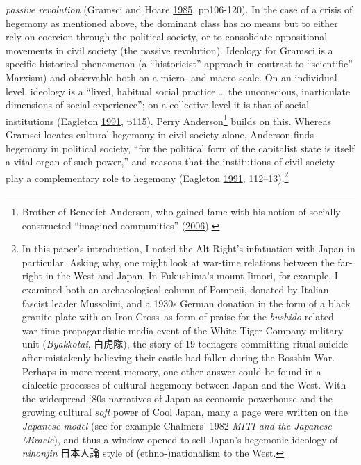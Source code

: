 \documentclass[10pt,british,A4paper,,openany]{memoir}
\begin{document}
\emph{passive revolution} (Gramsci and Hoare
\protect\hyperlink{ref-gramsci_selections_1985}{1985}, pp106-120). In
the case of a crisis of hegemony as mentioned above, the dominant class
has no means but to either rely on coercion through the political
society, or to consolidate oppositional movements in civil society (the
passive revolution). Ideology for Gramsci is a specific historical
phenomenon (a ``historicist'' approach in contrast to ``scientific''
Marxism) and observable both on a micro- and macro-scale. On an
individual level, ideology is a ``lived, habitual social practice
\ldots{} the unconscious, inarticulate dimensions of social
experience''; on a collective level it is that of social institutions
(Eagleton \protect\hyperlink{ref-eagleton_ideology:_1991}{1991}, p115).
Perry Anderson\footnote{Brother of Benedict Anderson, who gained fame
  with his notion of socially constructed ``imagined communities''
  (\protect\hyperlink{ref-anderson_imagined_2006}{2006}).} builds on
this. Whereas Gramsci locates cultural hegemony in civil society alone,
Anderson finds hegemony in political society, ``for the political form
of the capitalist state is itself a vital organ of such power,'' and
reasons that the institutions of civil society play a complementary role
to hegemony (Eagleton
\protect\hyperlink{ref-eagleton_ideology:_1991}{1991},
112--13).\footnote{In this paper's introduction, I noted the Alt-Right's
  infatuation with Japan in particular. Asking why, one might look at
  war-time relations between the far-right in the West and Japan. In
  Fukushima's mount Iimori, for example, I examined both an
  archaeological column of Pompeii, donated by Italian fascist leader
  Mussolini, and a 1930s German donation in the form of a black granite
  plate with an Iron Cross--as form of praise for the
  \emph{bushido}-related war-time propagandistic media-event of the
  White Tiger Company military unit (\emph{Byakkotai}, 白虎隊), the
  story of 19 teenagers committing ritual suicide after mistakenly
  believing their castle had fallen during the Bosshin War. Perhaps in
  more recent memory, one other answer could be found in a dialectic
  processes of cultural hegemony between Japan and the West. With the
  widespread `80s narratives of Japan as economic powerhouse and the
  growing cultural \emph{soft} power of Cool Japan, many a page were
  written on the \emph{Japanese model} (see for example Chalmers' 1982
  \emph{MITI and the Japanese Miracle}), and thus a window opened to
  sell Japan's hegemonic ideology of \emph{nihonjin} 日本人論 style of
  (ethno-)nationalism to the West.}
\end{document}
